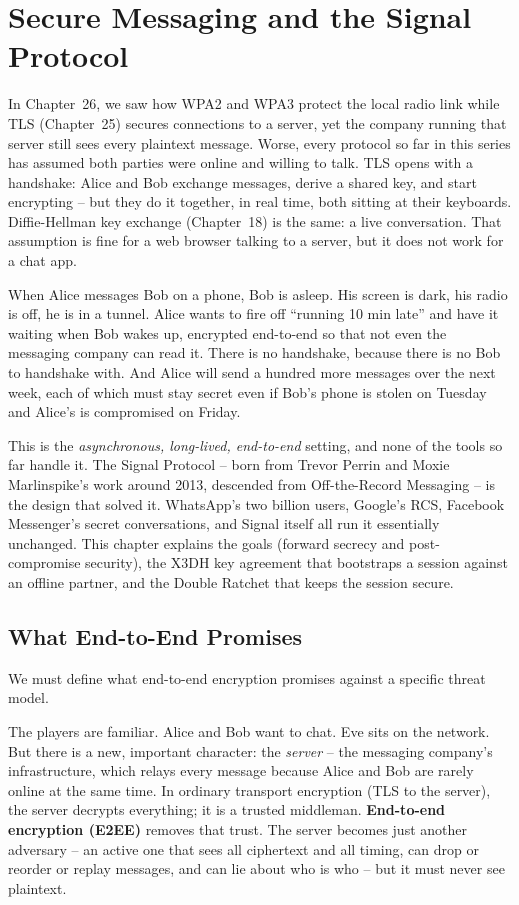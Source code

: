 \chapter{Secure Messaging and the Signal Protocol}

In Chapter~26, we saw how WPA2 and WPA3 protect the local radio link while TLS
(Chapter~25) secures connections to a server, yet the company running that server still
sees every plaintext message. Worse, every protocol so far in this series has assumed both parties were online and willing to talk. TLS opens with a handshake: Alice and Bob exchange messages, derive a shared key, and start encrypting -- but they do it together, in real time, both sitting at their keyboards. Diffie-Hellman key exchange (Chapter~18) is the same: a live conversation. That assumption is fine for a web browser talking to a server, but it does not work for a chat app.

When Alice messages Bob on a phone, Bob is asleep. His screen is dark, his radio is off, he is in a tunnel. Alice wants to fire off ``running 10 min late'' and have it waiting when Bob wakes up, encrypted end-to-end so that not even the messaging company can read it. There is no handshake, because there is no Bob to handshake with. And Alice will send a hundred more messages over the next week, each of which must stay secret even if Bob's phone is stolen on Tuesday and Alice's is compromised on Friday.

This is the \emph{asynchronous, long-lived, end-to-end} setting, and none of the tools so far handle it. The Signal Protocol -- born from Trevor Perrin and Moxie Marlinspike's work around 2013, descended from Off-the-Record Messaging -- is the design that solved it. WhatsApp's two billion users, Google's RCS, Facebook Messenger's secret conversations, and Signal itself all run it essentially unchanged. This chapter explains the goals (forward secrecy and post-compromise security), the X3DH key agreement that bootstraps a session against an offline partner, and the Double Ratchet that keeps the session secure.

\chapterline

\section{What End-to-End Promises}
\label{ch27:e2e-goals}

We must define what end-to-end encryption promises against a specific threat model.

The players are familiar. Alice and Bob want to chat. Eve sits on the network. But there is a new, important character: the \emph{server} -- the messaging company's infrastructure, which relays every message because Alice and Bob are rarely online at the same time. In ordinary transport encryption (TLS to the server), the server decrypts everything; it is a trusted middleman. \textbf{End-to-end encryption (E2EE)} removes that trust. The server becomes just another adversary -- an active one that sees all ciphertext and all timing, can drop or reorder or replay messages, and can lie about who is who -- but it must never see plaintext.

